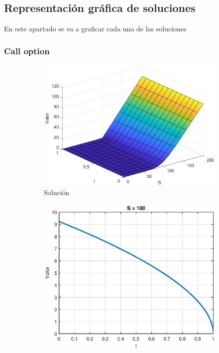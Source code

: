 \subsection{Representación gráfica de soluciones}
En este apartado se va a graficar cada una de las soluciones
\subsubsection{Call option}
\begin{figure}[H]
    \centering
    \begin{subfigure}[b]{0.35\linewidth}
        \includegraphics[width=\linewidth]{Imagenes/Parte1/6_Sols/Call/Call3D.eps}
        \caption{Solución}
    \end{subfigure}
    \begin{subfigure}[b]{0.35\linewidth}
        \includegraphics[width=\linewidth]{Imagenes/Parte1/6_Sols/Call/CallSFijo.eps}

\end{subfigure}
\end{figure}
